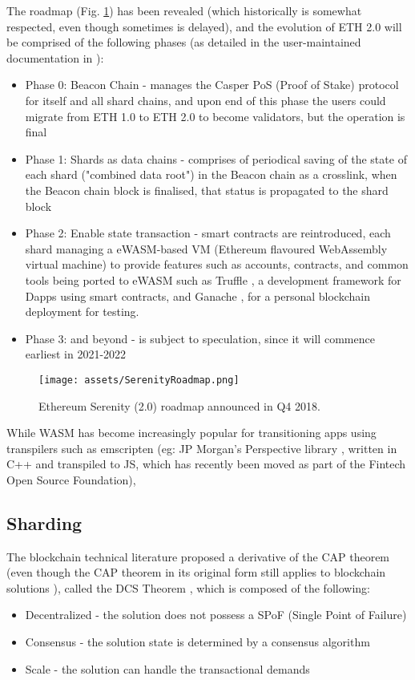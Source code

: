 \documentclass[runningheads]{llncs}
\begin{document}
The roadmap (Fig. \ref{fig:Serenity-1}) has been revealed (which historically is somewhat respected, even though sometimes is delayed), and the evolution of ETH 2.0 will be comprised of the following phases (as detailed in the user-maintained documentation in \cite{ETHphases}):
\begin{itemize}
    \item Phase 0: Beacon Chain - manages the Casper PoS (Proof of Stake) protocol for itself and all shard chains, and upon end of this phase the users could migrate from ETH 1.0 to ETH 2.0 to become validators, but the operation is final
    \item Phase 1: Shards as data chains - comprises of periodical saving of the state of each shard ("combined data root") in the Beacon chain as a crosslink, when the Beacon chain block is finalised, that status is propagated to the shard block
    \item Phase 2: Enable state transaction - smart contracts are reintroduced, each shard managing a eWASM-based VM (Ethereum flavoured WebAssembly virtual machine) to provide features such as accounts, contracts, and common tools being ported to eWASM such as Truffle \cite{Truffle}, a development framework for Dapps using smart contracts, and Ganache \cite{Ganache}, for a personal blockchain deployment for testing.
    \item Phase 3: and beyond - is subject to speculation, since it will commence earliest in 2021-2022
\end{itemize}


\begin{figure}
    \centering
    \texttt{[image: assets/SerenityRoadmap.png]}
    \caption[Ethereum Serenity Roadmap]{Ethereum Serenity (2.0) roadmap announced in Q4 2018.}
    \label{fig:Serenity-1}
\end{figure}

While WASM has become increasingly popular for transitioning apps using transpilers such as emscripten (eg: JP Morgan's Perspective library \cite{FINOSperspective}, written in C++ and transpiled to JS, which has recently been moved as part of the Fintech Open Source Foundation),

\subsection{Sharding}

The blockchain technical literature proposed a derivative of the CAP theorem (even though the CAP theorem in its original form still applies to blockchain solutions \cite{CAPblockchain}), called the DCS Theorem \cite{DCStheorem}, which is composed of the following:
\begin{itemize}
    \item Decentralized - the solution does not possess a SPoF (Single Point of Failure)
    \item Consensus - the solution state is determined by a consensus algorithm
    \item Scale - the solution can handle the transactional demands
\end{itemize}
\end{document}
